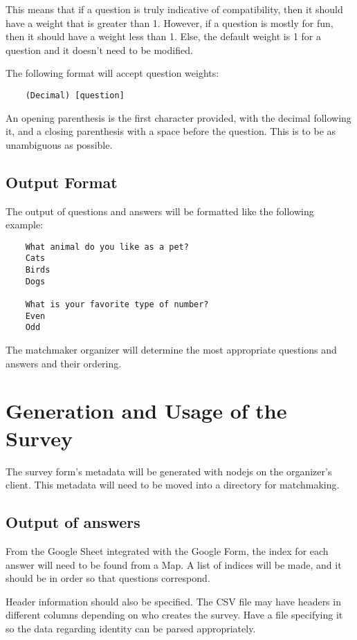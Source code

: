 \documentclass[12pt]{article}
\begin{document}
This means that if a question is truly indicative of compatibility, then it
should have a weight that is greater than 1. However, if a question is mostly
for fun, then it should have a weight less than 1. Else, the default weight is 1
for a question and it doesn't need to be modified.

The following format will accept question weights:

\begin{verbatim}
    (Decimal) [question]
\end{verbatim}

An opening parenthesis is the first character provided, with the decimal
following it, and a closing parenthesis with a space before the question. This
is to be as unambiguous as possible.

\subsection{Output Format}
The output of questions and answers will be formatted like the following
example:

\begin{verbatim}
    What animal do you like as a pet?
    Cats
    Birds
    Dogs

    What is your favorite type of number?
    Even
    Odd
\end{verbatim}

The matchmaker organizer will determine the most appropriate questions and
answers and their ordering.

\section{Generation and Usage of the Survey}
The survey form's metadata will be generated with nodejs on the organizer's
client. This metadata will need to be moved into a directory for matchmaking.

\subsection{Output of answers}
From the Google Sheet integrated with the Google Form, the index for each
answer will need to be found from a Map. A list of indices will be made, and it
should be in order so that questions correspond.

Header information should also be specified. The CSV file may have headers in
different columns depending on who creates the survey. Have a file specifying
it so the data regarding identity can be parsed appropriately.
\end{document}
